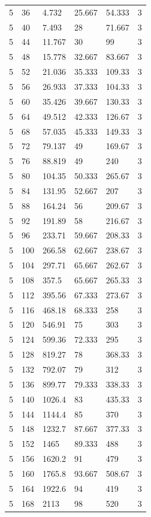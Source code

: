 \begin{tabular}{|p{0.6cm}|p{0.5cm}|p{1.15cm}|p{1cm}|p{1cm}|p{0.7cm}|}
5 & 36 & 4.732 & 25.667 & 54.333 & 3 \\
5 & 40 & 7.493 & 28 & 71.667 & 3 \\
5 & 44 & 11.767 & 30 & 99 & 3 \\
5 & 48 & 15.778 & 32.667 & 83.667 & 3 \\
5 & 52 & 21.036 & 35.333 & 109.33 & 3 \\
5 & 56 & 26.933 & 37.333 & 104.33 & 3 \\
5 & 60 & 35.426 & 39.667 & 130.33 & 3 \\
5 & 64 & 49.512 & 42.333 & 126.67 & 3 \\
5 & 68 & 57.035 & 45.333 & 149.33 & 3 \\
5 & 72 & 79.137 & 49 & 169.67 & 3 \\
5 & 76 & 88.819 & 49 & 240 & 3 \\
5 & 80 & 104.35 & 50.333 & 265.67 & 3 \\
5 & 84 & 131.95 & 52.667 & 207 & 3 \\
5 & 88 & 164.24 & 56 & 209.67 & 3 \\
5 & 92 & 191.89 & 58 & 216.67 & 3 \\
5 & 96 & 233.71 & 59.667 & 208.33 & 3 \\
5 & 100 & 266.58 & 62.667 & 238.67 & 3 \\
5 & 104 & 297.71 & 65.667 & 262.67 & 3 \\
5 & 108 & 357.5 & 65.667 & 265.33 & 3 \\
5 & 112 & 395.56 & 67.333 & 273.67 & 3 \\
5 & 116 & 468.18 & 68.333 & 258 & 3 \\
5 & 120 & 546.91 & 75 & 303 & 3 \\
5 & 124 & 599.36 & 72.333 & 295 & 3 \\
5 & 128 & 819.27 & 78 & 368.33 & 3 \\
5 & 132 & 792.07 & 79 & 312 & 3 \\
5 & 136 & 899.77 & 79.333 & 338.33 & 3 \\
5 & 140 & 1026.4 & 83 & 435.33 & 3 \\
5 & 144 & 1144.4 & 85 & 370 & 3 \\
5 & 148 & 1232.7 & 87.667 & 377.33 & 3 \\
5 & 152 & 1465 & 89.333 & 488 & 3 \\
5 & 156 & 1620.2 & 91 & 479 & 3 \\
5 & 160 & 1765.8 & 93.667 & 508.67 & 3 \\
5 & 164 & 1922.6 & 94 & 419 & 3 \\
5 & 168 & 2113 & 98 & 520 & 3 \\

\end{tabular}
